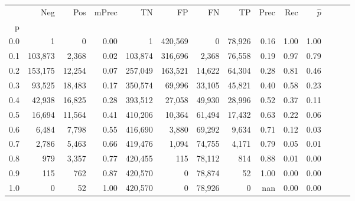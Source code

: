 \begin{tabular}{rrrrrrrrrrrrrr}
\toprule
{} &      Neg &     Pos & mPrec &       TN &       FP &      FN &      TP &  Prec &   Rec & $\hat{p}$ \\
p   &          &         &       &          &          &         &         &       &       &           \\
\midrule
0.0 &        1 &       0 &  0.00 &        1 &  420,569 &       0 &  78,926 &  0.16 &  1.00 &      1.00 \\
0.1 &  103,873 &   2,368 &  0.02 &  103,874 &  316,696 &   2,368 &  76,558 &  0.19 &  0.97 &      0.79 \\
0.2 &  153,175 &  12,254 &  0.07 &  257,049 &  163,521 &  14,622 &  64,304 &  0.28 &  0.81 &      0.46 \\
0.3 &   93,525 &  18,483 &  0.17 &  350,574 &   69,996 &  33,105 &  45,821 &  0.40 &  0.58 &      0.23 \\
0.4 &   42,938 &  16,825 &  0.28 &  393,512 &   27,058 &  49,930 &  28,996 &  0.52 &  0.37 &      0.11 \\
0.5 &   16,694 &  11,564 &  0.41 &  410,206 &   10,364 &  61,494 &  17,432 &  0.63 &  0.22 &      0.06 \\
0.6 &    6,484 &   7,798 &  0.55 &  416,690 &    3,880 &  69,292 &   9,634 &  0.71 &  0.12 &      0.03 \\
0.7 &    2,786 &   5,463 &  0.66 &  419,476 &    1,094 &  74,755 &   4,171 &  0.79 &  0.05 &      0.01 \\
0.8 &      979 &   3,357 &  0.77 &  420,455 &      115 &  78,112 &     814 &  0.88 &  0.01 &      0.00 \\
0.9 &      115 &     762 &  0.87 &  420,570 &        0 &  78,874 &      52 &  1.00 &  0.00 &      0.00 \\
1.0 &        0 &      52 &  1.00 &  420,570 &        0 &  78,926 &       0 &   nan &  0.00 &      0.00 \\
\bottomrule
\end{tabular}
